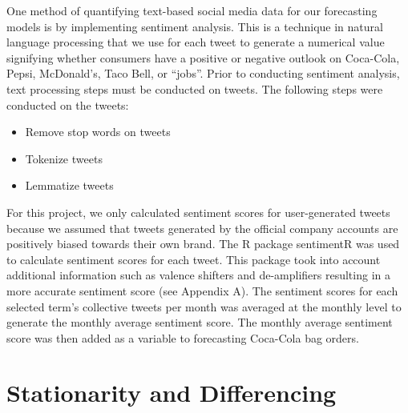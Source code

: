 \documentclass[12pt,oneside]{chicagocapstone}
\providecommand{\tightlist}{%
  \setlength{\itemsep}{0pt}\setlength{\parskip}{0pt}}
\begin{document}
One method of quantifying text-based social media data for our forecasting models is by implementing sentiment analysis. This is a technique in natural language processing that we use for each tweet to generate a numerical value signifying whether consumers have a positive or negative outlook on Coca-Cola, Pepsi, McDonald's, Taco Bell, or ``jobs''. Prior to conducting sentiment analysis, text processing steps must be conducted on tweets. The following steps were conducted on the tweets:
\begin{itemize}
\tightlist
\item
  Remove stop words on tweets
\item
  Tokenize tweets
\item
  Lemmatize tweets
\end{itemize}
For this project, we only calculated sentiment scores for user-generated tweets because we assumed that tweets generated by the official company accounts are positively biased towards their own brand. The R package sentimentR was used to calculate sentiment scores for each tweet. This package took into account additional information such as valence shifters and de-amplifiers resulting in a more accurate sentiment score (see Appendix A). The sentiment scores for each selected term's collective tweets per month was averaged at the monthly level to generate the monthly average sentiment score. The monthly average sentiment score was then added as a variable to forecasting Coca-Cola bag orders.

\hypertarget{stationarity-and-differencing}{%
\section*{Stationarity and Differencing}\label{stationarity-and-differencing}}
\end{document}
